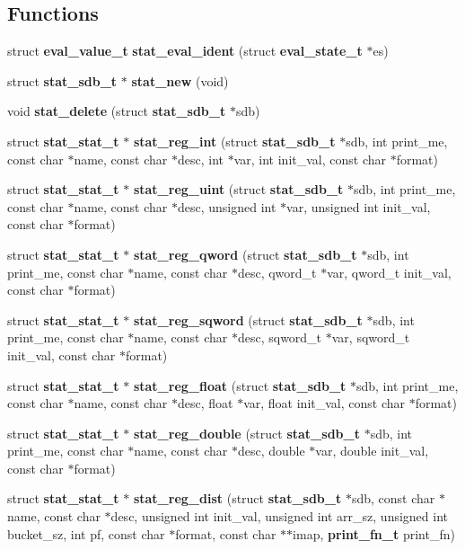 \subsection*{Functions}
\begin{CompactItemize}
\item 
struct {\bf eval\_\-value\_\-t} {\bf stat\_\-eval\_\-ident} (struct {\bf eval\_\-state\_\-t} $\ast$es)
\item 
struct {\bf stat\_\-sdb\_\-t} $\ast$ {\bf stat\_\-new} (void)
\item 
void {\bf stat\_\-delete} (struct {\bf stat\_\-sdb\_\-t} $\ast$sdb)
\item 
struct {\bf stat\_\-stat\_\-t} $\ast$ {\bf stat\_\-reg\_\-int} (struct {\bf stat\_\-sdb\_\-t} $\ast$sdb, int print\_\-me, const char $\ast$name, const char $\ast$desc, int $\ast$var, int init\_\-val, const char $\ast$format)
\item 
struct {\bf stat\_\-stat\_\-t} $\ast$ {\bf stat\_\-reg\_\-uint} (struct {\bf stat\_\-sdb\_\-t} $\ast$sdb, int print\_\-me, const char $\ast$name, const char $\ast$desc, unsigned int $\ast$var, unsigned int init\_\-val, const char $\ast$format)
\item 
struct {\bf stat\_\-stat\_\-t} $\ast$ {\bf stat\_\-reg\_\-qword} (struct {\bf stat\_\-sdb\_\-t} $\ast$sdb, int print\_\-me, const char $\ast$name, const char $\ast$desc, qword\_\-t $\ast$var, qword\_\-t init\_\-val, const char $\ast$format)
\item 
struct {\bf stat\_\-stat\_\-t} $\ast$ {\bf stat\_\-reg\_\-sqword} (struct {\bf stat\_\-sdb\_\-t} $\ast$sdb, int print\_\-me, const char $\ast$name, const char $\ast$desc, sqword\_\-t $\ast$var, sqword\_\-t init\_\-val, const char $\ast$format)
\item 
struct {\bf stat\_\-stat\_\-t} $\ast$ {\bf stat\_\-reg\_\-float} (struct {\bf stat\_\-sdb\_\-t} $\ast$sdb, int print\_\-me, const char $\ast$name, const char $\ast$desc, float $\ast$var, float init\_\-val, const char $\ast$format)
\item 
struct {\bf stat\_\-stat\_\-t} $\ast$ {\bf stat\_\-reg\_\-double} (struct {\bf stat\_\-sdb\_\-t} $\ast$sdb, int print\_\-me, const char $\ast$name, const char $\ast$desc, double $\ast$var, double init\_\-val, const char $\ast$format)
\item 
struct {\bf stat\_\-stat\_\-t} $\ast$ {\bf stat\_\-reg\_\-dist} (struct {\bf stat\_\-sdb\_\-t} $\ast$sdb, const char $\ast$name, const char $\ast$desc, unsigned int init\_\-val, unsigned int arr\_\-sz, unsigned int bucket\_\-sz, int pf, const char $\ast$format, const char $\ast$$\ast$imap, {\bf print\_\-fn\_\-t} print\_\-fn)
$$
\end{CompactItemize}
